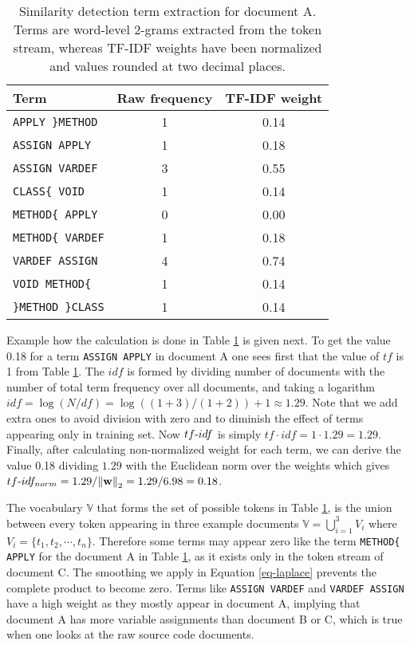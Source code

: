 \begin{table}[ht]
\centering
\caption{Similarity detection term extraction for document A. Terms are word-level 2-grams extracted from the token stream, whereas TF-IDF weights have been normalized and values rounded at two decimal places.}
\label{tbl-ngram-sd}
\begin{tabular}{l|c|c}
\bf Term & \bf Raw frequency & \bf TF-IDF weight \\ \hline
    \texttt{APPLY \}METHOD} & 1 & 0.14\\
    \texttt{ASSIGN APPLY} & 1 & 0.18\\
    \texttt{ASSIGN VARDEF} & 3 & 0.55\\
    \texttt{CLASS\{ VOID} & 1 & 0.14\\
    \texttt{METHOD\{ APPLY} & 0 & 0.00\\
    \texttt{METHOD\{ VARDEF} & 1 & 0.18\\
    \texttt{VARDEF ASSIGN} & 4 & 0.74\\
    \texttt{VOID METHOD\{} & 1 & 0.14\\
    \texttt{\}METHOD \}CLASS} & 1 & 0.14\\
\end{tabular}
\end{table}

\noindent
Example how the calculation is done in Table \ref{tbl-ngram-sd} is given next. To get the value 0.18 for a term \texttt{ASSIGN APPLY} in document A one sees first that the value of $tf$ is 1 from Table \ref{tbl-ngram-sd}. The $idf$ is formed by dividing number of documents with the number of total term frequency over all documents, and taking a logarithm \ie $idf = \log(N/df) = \log((1+3)/(1+2)) + 1 \approx 1.29$. Note that we add extra ones to avoid division with zero and to diminish the effect of terms appearing only in training set. Now $tf{\text -}idf$ is simply $tf \cdot idf = 1 \cdot 1.29 = 1.29$. Finally, after calculating non-normalized weight for each term, we can derive the value 0.18 dividing $1.29$ with the Euclidean norm over the weights which gives $tf{\text -}idf_{norm} = 1.29 / \! \left\lVert\mathbf{w}\right\rVert_2 = 1.29 / 6.98 = 0.18$.

The vocabulary $\mathbb{V}$ that forms the set of possible tokens in Table \ref{tbl-ngram-sd}, is the union between every token appearing in three example documents \ie $\mathbb{V} = \bigcup_{i=1}^{3} V_i$ where $V_i = \{t_1, t_2, \cdots, t_n\}$. Therefore some terms may appear zero like the term \texttt{METHOD\{ APPLY} for the document A in Table \ref{tbl-ngram-sd}, as it exists only in the token stream of document C. The smoothing we apply in Equation \ref{eq-laplace} prevents the complete product to become zero. Terms like \texttt{ASSIGN VARDEF} and \texttt{VARDEF ASSIGN} have a high weight as they mostly appear in document A, implying that document A has more variable assignments than document B or C, which is true when one looks at the raw source code documents. 

